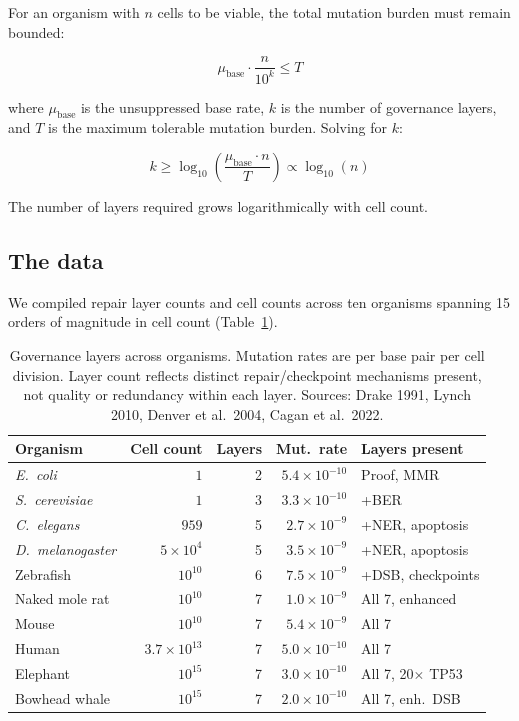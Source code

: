 \documentclass[11pt]{article}
\theoremstyle{definition}
\begin{document}
For an organism with $n$ cells to be viable, the total mutation burden
must remain bounded:

\[
\mu_{\text{base}} \cdot \frac{n}{10^k} \leq T
\]

where $\mu_{\text{base}}$ is the unsuppressed base rate, $k$ is the
number of governance layers, and $T$ is the maximum tolerable mutation
burden. Solving for $k$:

\[
k \geq \log_{10}\left(\frac{\mu_{\text{base}} \cdot n}{T}\right) \propto \log_{10}(n)
\]

The number of layers required grows logarithmically with cell count.

\subsection{The data}

We compiled repair layer counts and cell counts across ten organisms
spanning 15 orders of magnitude in cell count (Table~\ref{tab:organisms}).

\begin{table}[h]
\centering
\small
\begin{tabular}{lrrrl}
\toprule
\textbf{Organism} & \textbf{Cell count} & \textbf{Layers} & \textbf{Mut.\ rate} & \textbf{Layers present} \\
\midrule
\textit{E.\ coli} & $1$ & 2 & $5.4 \times 10^{-10}$ & Proof, MMR \\
\textit{S.\ cerevisiae} & $1$ & 3 & $3.3 \times 10^{-10}$ & +BER \\
\textit{C.\ elegans} & $959$ & 5 & $2.7 \times 10^{-9}$ & +NER, apoptosis \\
\textit{D.\ melanogaster} & $5 \times 10^4$ & 5 & $3.5 \times 10^{-9}$ & +NER, apoptosis \\
Zebrafish & $10^{10}$ & 6 & $7.5 \times 10^{-9}$ & +DSB, checkpoints \\
Naked mole rat & $10^{10}$ & 7 & $1.0 \times 10^{-9}$ & All 7, enhanced \\
Mouse & $10^{10}$ & 7 & $5.4 \times 10^{-9}$ & All 7 \\
Human & $3.7 \times 10^{13}$ & 7 & $5.0 \times 10^{-10}$ & All 7 \\
Elephant & $10^{15}$ & 7 & $3.0 \times 10^{-10}$ & All 7, 20$\times$ TP53 \\
Bowhead whale & $10^{15}$ & 7 & $2.0 \times 10^{-10}$ & All 7, enh.\ DSB \\
\bottomrule
\end{tabular}
\caption{Governance layers across organisms. Mutation rates are per
base pair per cell division. Layer count reflects distinct repair/checkpoint
mechanisms present, not quality or redundancy within each layer. Sources:
Drake 1991, Lynch 2010, Denver et al.\ 2004, Cagan et al.\ 2022.}
\label{tab:organisms}
\end{table}
\end{document}
